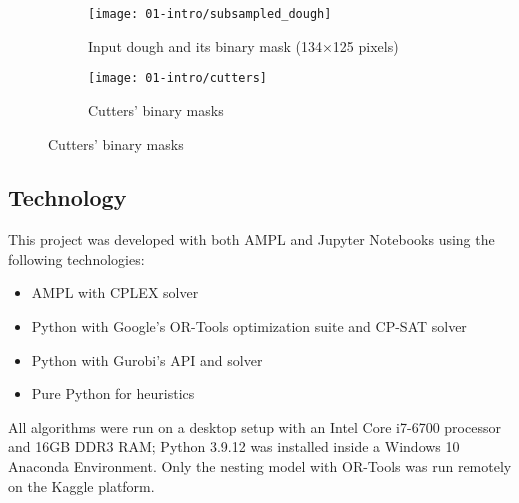 \begin{figure}[p]
	\begin{subfigure}{\textwidth}
		\centering	
		\texttt{[image: 01-intro/subsampled\_dough]}
		\caption{Input dough and its binary mask (134×125 pixels)}
		\label{fig:input_dough}
	\end{subfigure}
	
	\begin{subfigure}{\textwidth}
		\centering	
		\texttt{[image: 01-intro/cutters]}
		\caption{Cutters' binary masks}
		\label{fig:cutters}
	\end{subfigure}
\end{figure}

\newpage

\subsection{Technology}
This project was developed with both AMPL and Jupyter Notebooks using the following technologies:
\begin{itemize}[itemsep=-1mm, topsep=0mm]
	\item AMPL with CPLEX solver
	\item Python with Google's OR-Tools optimization suite and CP-SAT solver
	\item Python with Gurobi's API and solver
	\item Pure Python for heuristics
\end{itemize}
All algorithms were run on a desktop setup with an Intel Core i7-6700 processor and 16GB DDR3 RAM; Python 3.9.12 was installed inside a Windows 10 Anaconda Environment. Only the nesting model with OR-Tools was run remotely on the Kaggle platform.

